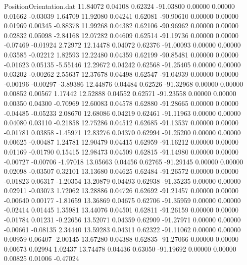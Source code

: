 \begin{filecontents}{PositionOrientation.dat}
  11.84072    0.04108    0.62324   -91.03800    0.00000    0.00000    0.01662   -0.03039    1.64709
  11.92080    0.04241    0.62081   -90.90610    0.00000    0.00000    0.01969    0.00345   -0.88378
  11.99268    0.04382    0.62106   -90.96962    0.00000    0.00000    0.02832    0.05098   -2.84168
  12.07282    0.04609    0.62514   -91.19736    0.00000    0.00000   -0.07469   -0.01924    2.72972
  12.14478    0.04072    0.62376   -91.00093    0.00000    0.00000    0.03585   -0.02212    1.82593
  12.22480    0.04359    0.62199   -90.85481    0.00000    0.00000   -0.01623    0.05135   -5.55146
  12.29672    0.04242    0.62568   -91.25405    0.00000    0.00000    0.03202   -0.00262    2.55637
  12.37678    0.04498    0.62547   -91.04939    0.00000    0.00000   -0.00196   -0.00297   -3.89386
  12.44876    0.04484    0.62526   -91.32968    0.00000    0.00000    0.00852    0.00567    1.17442
  12.52888    0.04552    0.62571   -91.23558    0.00000    0.00000    0.00350    0.04300   -0.70969
  12.60083    0.04578    0.62880   -91.28665    0.00000    0.00000   -0.04485   -0.05233    2.08670
  12.68086    0.04219    0.62461   -91.11963    0.00000    0.00000    0.04080    0.03110   -0.21858
  12.75286    0.04512    0.62685   -91.13537    0.00000    0.00000   -0.01781    0.03858   -1.45971
  12.83276    0.04370    0.62994   -91.25200    0.00000    0.00000    0.00625   -0.00487    1.24781
  12.90479    0.04415    0.62959   -91.16212    0.00000    0.00000    0.01169   -0.01790    0.15415
  12.98473    0.04509    0.62815   -91.14980    0.00000    0.00000   -0.00727   -0.00706   -1.97018
  13.05663    0.04456    0.62765   -91.29145    0.00000    0.00000    0.02098   -0.03507    0.32101
  13.13680    0.04625    0.62484   -91.26572    0.00000    0.00000   -0.01823    0.06317   -1.20354
  13.20879    0.04493    0.62938   -91.35235    0.00000    0.00000    0.02911   -0.03073    1.72062
  13.28886    0.04726    0.62692   -91.21457    0.00000    0.00000   -0.00640    0.00177   -1.81659
  13.36869    0.04675    0.62706   -91.35959    0.00000    0.00000   -0.02414    0.01445    1.35981
  13.44076    0.04501    0.62811   -91.26159    0.00000    0.00000   -0.01784    0.01231   -0.22656
  13.52071    0.04359    0.62909   -91.27971    0.00000    0.00000   -0.00661   -0.08135    2.34440
  13.59283    0.04311    0.62322   -91.11062    0.00000    0.00000    0.00959    0.06407   -2.00145
  13.67280    0.04388    0.62835   -91.27066    0.00000    0.00000    0.00673    0.02994    1.02437
  13.74478    0.04436    0.63050   -91.19692    0.00000    0.00000    0.00825    0.01006   -0.47024

\end{filecontents}
